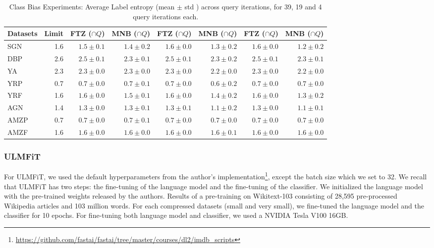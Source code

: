 \documentclass[11pt,a4paper]{article}
\begin{document}
\begin{table*}[t]
\small\addtolength{\tabcolsep}{-4.5pt}
  \centering
  \begin{tabular}{|l||r||r|r||r|r||r|r||}
  \hline 
  Datasets & Limit & FTZ ($\cap Q$) & MNB ($\cap Q$)  &  FTZ ($\cap Q$) &  MNB ($\cap Q$) & FTZ ($\cap Q$) & MNB ($\cap Q$) \\ \hline \hline
  SGN & 1.6 & $1.5 \pm 0.1$ & $1.4 \pm 0.2$ & $1.6 \pm 0.0$ & $1.3 \pm 0.2$  & $1.6 \pm 0.0$ & $1.2 \pm 0.2$  \\ \hline 
DBP & 2.6 & $2.5 \pm 0.1$ & $2.3 \pm 0.1$ & $2.5 \pm 0.1$ & $2.3 \pm 0.2$  & $2.5 \pm 0.1$ & $2.3 \pm 0.1$ \\ \hline
  YA &  2.3 & $2.3 \pm 0.0$ &  $2.3 \pm 0.0$ &  $2.3 \pm 0.0$  &  $2.2 \pm 0.0$  &  $2.3 \pm 0.0$ &   $2.2 \pm 0.0$ \\ \hline 
  YRP &  0.7 &  $0.7 \pm 0.0$ &  $0.7 \pm 0.1$&  $0.7 \pm 0.0$ &  $0.6 \pm 0.2$ &  $0.7 \pm 0.0$ &  $0.7 \pm 0.0$ \\ \hline 
  YRF &  1.6 &  $1.6 \pm 0.0$ & $1.5 \pm 0.1$  & $1.6 \pm 0.0$ &  $1.4 \pm 0.2$ &  $1.6 \pm 0.0$ & $1.3 \pm 0.2$ \\ \hline 
  AGN  & 1.4 & $1.3 \pm 0.0$ & $1.3 \pm 0.1$ & $1.3 \pm 0.1$ & $1.1 \pm 0.2$ & $1.3 \pm 0.0$ & $1.1 \pm 0.1$ \\ \hline 
  AMZP  & 0.7 & $0.7 \pm 0.0$ &  $0.7 \pm 0.1$ & $0.7 \pm 0.0$ &  $0.7 \pm 0.0$ & $0.7 \pm 0.0$ &  $0.7 \pm 0.0$\\ \hline 
  AMZF &  1.6  &  $1.6 \pm 0.0$ &  $1.6 \pm 0.0$ &  $1.6 \pm 0.0$ &  $1.6 \pm 0.1$  &  $1.6 \pm 0.0$ &  $1.6 \pm 0.0$\\ \hline
  \end{tabular}
  \centering
\caption{Class Bias Experiments: Average Label entropy (mean $\pm$ std ) across  query iterations, for 39, 19 and 4 query iterations each.} 
 \label{tab:label_entropy}
\end{table*}
\subsubsection{ULMFiT}
For ULMFiT, we used the default hyperparameters from the author's implementation\footnote{\url{https://github.com/fastai/fastai/tree/master/courses/dl2/imdb\_scripts}}, except the batch size which we set to 32. We recall that ULMFiT has two steps: the fine-tuning of the language model and the fine-tuning of the classifier. We initialized the language model with the  pre-trained weights released by the authors. Results of a pre-training on Wikitext-103 consisting of 28,595 pre-processed Wikipedia articles and 103 million words. For each compressed datasets (small and very small), we fine-tuned the language model and the classifier for 10 epochs. For fine-tuning both language model and classifier, we used a NVIDIA Tesla V100 16GB.   
\end{document}
